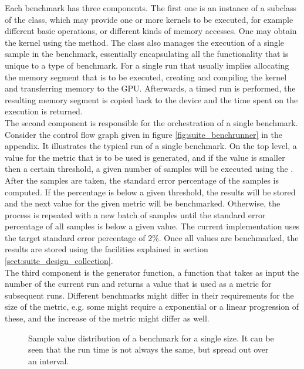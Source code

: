 Each benchmark has three components. The first one is an instance of a subclass of the  class, which may provide one or more kernels to be executed, for example different basic operations, or different kinds of memory accesses. One may obtain the kernel using the  method. The class also manages the execution of a single sample in the benchmark, essentially encapsulating all the functionality that is unique to a type of benchmark. For a single run that usually implies allocating the memory segment that is to be executed, creating and compiling the kernel and transferring memory to the GPU. Afterwards, a timed run is performed, the resulting memory segment is copied back to the device and the time spent on the execution is returned. \\

The second component is responsible for the orchestration of a single benchmark. Consider the control flow graph given in figure \ref{fig:suite_benchrunner} in the appendix. It illustrates the typical run of a single benchmark. On the top level, a value for the metric that is to be used is generated, and if the value is smaller then a certain threshold, a given number of samples will be executed using the . After the samples are taken, the standard error percentage of the samples is computed. If the percentage is below a given threshold, the results will be stored and the next value for the given metric will be benchmarked. Otherwise, the process is repeated with a new batch of samples until the standard error percentage of all samples is below a given value. The current implementation uses the target standard error percentage of 2\%. Once all values are benchmarked, the results are stored using the facilities explained in section \ref{sect:suite_design_collection}.\\

The third component is the generator function, a function that takes as input the number of the current run and returns a value that is used as a metric for subsequent runs. Different benchmarks might differ in their requirements for the size of the metric, e.g. some might require a exponential or a linear progression of these, and the increase of the metric might differ as well.

\begin{figure}
	\begin{center}
	\end{center}
	\caption{Sample value distribution of a benchmark for a single size. It can be seen that the run time is not always the same, but spread out over an interval.}
	\label{fig:suite_value_distribution}
\end{figure}

